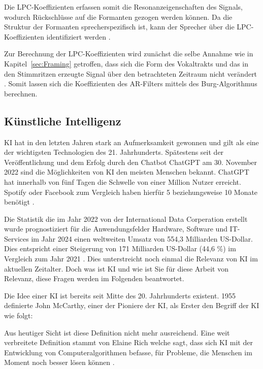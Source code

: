 Die \ac{LPC}-Koeffizienten erfassen somit die Resonanzeigenschaften des Signals, wodurch Rückschlüsse auf die Formanten gezogen werden können.
Da die Struktur der Formanten sprecherspezifisch ist, kann der Sprecher über die \ac{LPC}-Koeffizienten identifiziert werden \autocite[vgl.][S. 117]{sidorov_text-independent_2010}.

Zur Berechnung der \ac{LPC}-Koeffizienten wird zunächst die selbe Annahme wie in Kapitel~\ref{sec:Framing} getroffen, dass sich die Form des Vokaltrakts und das in den Stimmritzen erzeugte Signal über den betrachteten Zeitraum nicht verändert \autocite[vgl.][S. 1304]{atal_effectiveness_1974}.
Somit lassen sich die Koeffizienten des \ac{AR}-Filters mittels des Burg-Algorithmus berechnen.

\subsection{Künstliche Intelligenz}

\textauthor{\vLB}{}{}

\ac{KI} hat in den letzten Jahren stark an Aufmerksamkeit gewonnen und gilt als eine der wichtigsten Technologien des 21. Jahrhunderts.
Spätestens seit der Veröffentlichung und dem Erfolg durch den Chatbot ChatGPT am 30. November 2022 sind die Möglichkeiten von \ac{KI} den meisten Menschen bekannt. 
ChatGPT hat innerhalb von fünf Tagen die Schwelle von einer Million Nutzer erreicht. 
Spotify oder Facebook zum Vergleich haben hierfür 5 beziehungsweise 10 Monate benötigt \autocite[vgl. ][]{janson_infografik_2023}.

Die Statistik die im Jahr 2022 von der International Data Corperation erstellt wurde prognostiziert für die Anwendungsfelder Hardware, Software und IT-Services im Jahr 2024 einen weltweiten Umsatz von 554,3 Milliarden US-Dollar.
Dies entspricht einer Steigerung von 171 Milliarden US-Dollar (44,6 \%) im Vergleich zum Jahr 2021 \autocite[vgl. ][]{idc_kunstliche_2022}.
Dies unterstreicht noch einmal die Relevanz von \ac{KI} im aktuellen Zeitalter.
Doch was ist \ac{KI} und wie ist Sie für diese Arbeit von Relevanz, diese Fragen werden im Folgenden beantwortet.

Die Idee einer \ac{KI} ist bereits seit Mitte des 20. Jahrhunderts existent. 1955 definierte John McCarthy, einer der Pioniere der \ac{KI}, als Erster den Begriff der \ac{KI} wie folgt:
\begin{quote}
  \autocite[][S. 1]{ertel_grundkurs_2016}
\end{quote}\noindent
Aus heutiger Sicht ist diese Definition nicht mehr ausreichend.
Eine weit verbreitete Definition stammt von Elaine Rich welche sagt, dass sich \ac{KI} mit der Entwicklung von Computeralgorithmen befasse, für Probleme, die Menschen im Moment noch besser lösen können \autocite[vgl. ][]{rich_artificial_1983}.

